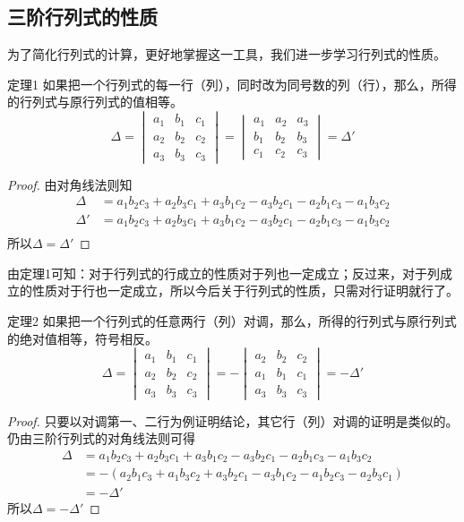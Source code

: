 \subsection{三阶行列式的性质}

为了简化行列式的计算，更好地掌握这一工具，我们进一步学习行列式的性质。

\begin{blk}{定理1 }
    如果把一个行列式的每一行（列），同时改为同号数的列（行），那么，所得的行列式与原行列式的值相等。
\[\Delta=\begin{vmatrix}
    a_1&b_1&c_1\\a_2&b_2&c_2\\a_3&b_3&c_3
\end{vmatrix}=\begin{vmatrix}
    a_1&a_2&a_3\\b_1&b_2&b_3\\c_1&c_2&c_3
\end{vmatrix}=\Delta'\]
\end{blk}

 \begin{proof}
由对角线法则知    
\[\begin{split}
    \Delta &=a_1b_2c_3+a_2b_3c_1+a_3b_1c_2-a_3b_2c_1-a_2b_1c_3-a_1b_3c_2\\
    \Delta'&=a_1b_2c_3+a_2b_3c_1+a_3b_1c_2-a_3b_2c_1-a_2b_1c_3-a_1b_3c_2\\
\end{split}\]
所以$\Delta=\Delta'$
 \end{proof}


 由定理1可知：对于行列式的行成立的性质对于列也一定成立；反过来，对于列成立的性质对于行也一定成立，所以今后关于行列式的性质，只需对行证明就行了。

\begin{blk}{定理2}
    如果把一个行列式的任意两行（列）对调，那么，所得的行列式与原行列式的绝对值相等，符号相反。
    \[\Delta=\begin{vmatrix}
        a_1&b_1&c_1\\a_2&b_2&c_2\\a_3&b_3&c_3
    \end{vmatrix}=-\begin{vmatrix}
        a_2&b_2&c_2\\a_1&b_1&c_1\\a_3&b_3&c_3
    \end{vmatrix}=-\Delta'\]
\end{blk} 

\begin{proof}
    只要以对调第一、二行为例证明结论，其它行（列）对调的证明是类似的。
    仍由三阶行列式的对角线法则可得
    \[\begin{split}
        \Delta&=a_1b_2c_3+a_2b_3c_1+a_3b_1c_2-a_3b_2c_1-a_2b_1c_3-a_1b_3c_2\\
        &=-(a_2b_1c_3+a_1b_3c_2+a_3b_2c_1-a_3b_1c_2-a_1b_2c_3-a_2b_3c_1)\\
        &=-\Delta'
    \end{split}\]
    所以$\Delta=-\Delta'$
\end{proof}

